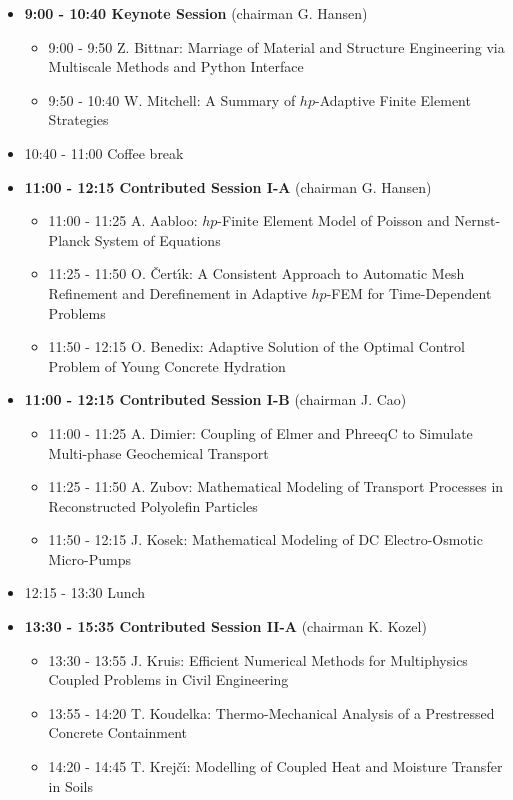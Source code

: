 \documentclass[10pt, A4]{article}%
\begin{document}
\begin{itemize}    
  \item {\bf 9:00 - 10:40 Keynote Session} (chairman G. Hansen) 
  \begin{itemize}
    \item 9:00 - 9:50 Z. Bittnar: Marriage of Material and Structure Engineering via Multiscale Methods and Python Interface
    \item 9:50 - 10:40 W. Mitchell: A Summary of $hp$-Adaptive Finite Element Strategies
  \end{itemize}
  \item 10:40 - 11:00 Coffee break
  \item {\bf 11:00 - 12:15 Contributed Session I-A} (chairman G. Hansen) 
  \begin{itemize}
    \item 11:00 - 11:25 A. Aabloo: $hp$-Finite Element Model of Poisson and Nernst-Planck System of Equations
    \item 11:25 - 11:50 O. \v Cert\'{\i}k: A Consistent Approach to Automatic Mesh Refinement and Derefinement in Adaptive $hp$-FEM 
       for Time-Dependent Problems
    \item 11:50 - 12:15 O. Benedix: Adaptive Solution of the Optimal Control Problem of Young Concrete Hydration
  \end{itemize}
  \item {\bf 11:00 - 12:15 Contributed Session I-B} (chairman J. Cao) 
  \begin{itemize}
    \item 11:00 - 11:25 A. Dimier: Coupling of Elmer and PhreeqC to Simulate Multi-phase Geochemical Transport
    \item 11:25 - 11:50 A. Zubov: Mathematical Modeling of Transport Processes in Reconstructed Polyolefin Particles
    \item 11:50 - 12:15 J. Kosek: Mathematical Modeling of DC Electro-Osmotic Micro-Pumps
  \end{itemize}
  \item 12:15 - 13:30 Lunch
  \item {\bf 13:30 - 15:35 Contributed Session II-A} (chairman K. Kozel) 
  \begin{itemize}
    \item 13:30 - 13:55 J. Kruis: Efficient Numerical Methods for Multiphysics Coupled Problems in Civil Engineering
    \item 13:55 - 14:20 T. Koudelka: Thermo-Mechanical Analysis of a Prestressed Concrete Containment
    \item 14:20 - 14:45 T. Krej\v c\'{\i}: Modelling of Coupled Heat and Moisture Transfer in Soils

\end{itemize}
\end{itemize}
\end{document}
